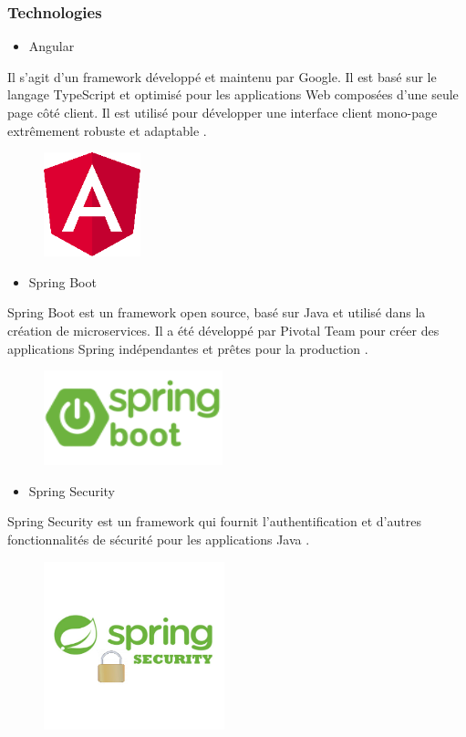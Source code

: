 \subsubsection{	Technologies}
\begin{itemize}
    \item 	Angular 
\end{itemize}
\par Il s’agit d’un framework développé et maintenu par Google. Il est basé sur le langage TypeScript et optimisé pour les applications Web composées d’une seule page côté client. Il est utilisé pour développer une interface client mono-page extrêmement robuste et adaptable \cite{9}.
\begin{figure}[h]
    \centering
    \includegraphics{figures/33anis9.png}
    \caption*{}
    \label{fig:logo_ANGULAR}
\end{figure}
\begin{itemize}
    \item	Spring Boot 
\end{itemize}
\par Spring Boot est un framework open source, basé sur Java et utilisé dans la création de microservices. Il a été développé par Pivotal Team pour créer des applications Spring indépendantes et prêtes pour la production \cite{5}. 
\begin{figure}[h]
    \centering
    \includegraphics{figures/33anis10.png}
    \caption*{}
    \label{fig:logo_SPRINGB}
\end{figure}
\begin{itemize}
    \item	Spring Security
\end{itemize}
\par Spring Security est un framework qui fournit l’authentification et d’autres fonctionnalités de sécurité pour les applications Java \cite{5}.
\begin{figure}[h]
    \centering
    \includegraphics{figures/33anis11.png}
    \caption*{}
    \label{fig:logo_SPRINGS}
\end{figure}

